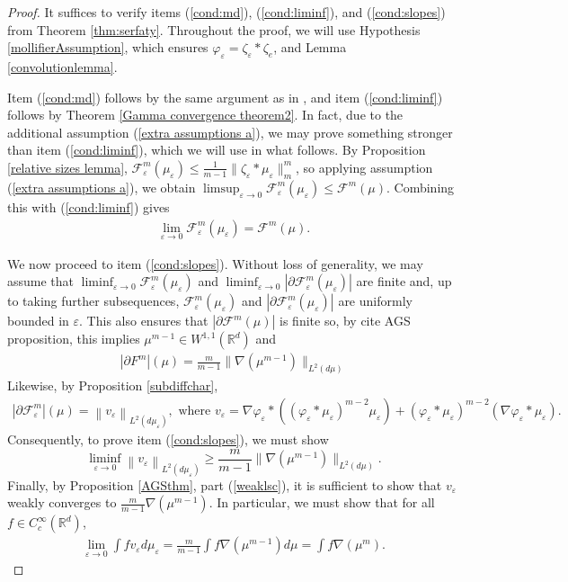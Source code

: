 \documentclass[11pt,leqno]{amsart}
\theoremstyle{definition}
\newcommand{\Rd}{{\mathord{\mathbb R}^d}}
\newcommand{\grad}{\nabla}
\newcommand{\F}{\mathcal{F}}
\def\epsilon{\varepsilon}
\def\e{\varepsilon}
\def\F{\mathcal{F}}
\begin{document}
\begin{proof}
It suffices to verify items (\ref{cond:md}), (\ref{cond:liminf}), and (\ref{cond:slopes}) from Theorem \ref{thm:serfaty}. Throughout the proof, we will use Hypothesis \ref{mollifierAssumption}, which ensures $\varphi_\e = \zeta_\e*\zeta_e$, and Lemma \ref{convolutionlemma}.

Item (\ref{cond:md}) follows by the same argument as in \cite[Theorem 5.6]{CraigTopaloglu}, and item (\ref{cond:liminf}) follows by Theorem \ref{Gamma convergence theorem2}. In fact, due to the additional assumption (\ref{extra assumptions a}), we may prove something stronger than item (\ref{cond:liminf}), which we will use in what follows. By Proposition \ref{relative sizes lemma},
$\F_\e^m(\mu_\e) \leq \frac{1}{m-1} \|\zeta_\e*\mu_\e\|_m^m$, so applying assumption (\ref{extra assumptions a}), we obtain $\limsup_{\e \to 0} \F_\e^m(\mu_\e) \leq \F^m(\mu)$.
Combining this with (\ref{cond:liminf}) gives 
\begin{align} \label{energyconv}
\lim_{\e \to 0} \F^m_\e(\mu_\e) = \F^m(\mu).
\end{align}

We now proceed to item (\ref{cond:slopes}). Without loss of generality, we may assume that $\liminf_{\e \to 0}\F^m_\e(\mu_\e)$ and $\liminf_{\e \to 0} |\partial \F^m_\e(\mu_\e)|$ are finite and, up to taking further subsequences, $\F^m_\e(\mu_\e)$ and $|\partial \F^m_\e(\mu_\e)|$ are uniformly bounded in $\epsilon$. This also ensures that $|\partial \F^m(\mu)|$ is finite so, by {\color{Aquamarine} cite AGS proposition}, this implies $\mu^{m-1} \in W^{1,1}(\Rd)$ and 
\begin{align*}
|\partial F^m|(\mu) = \frac{m}{m-1} \| \grad (\mu^{m-1} ) \|_{L^2(d \mu)}
\end{align*}
Likewise, by Proposition \ref{subdiffchar},
\begin{align} \label{vepsdef}
|\partial \F^m_\e|(\mu) = \left\|v_\e \right\|_{L^2(d \mu_\e)}, \text{ where } v_\e = \grad \varphi_\e* \left((\varphi_\e*\mu_\e)^{m-2} \mu_\e \right) + (\varphi_\e* \mu_\e)^{m-2} (\grad \varphi_\e * \mu_\e).
\end{align}
Consequently, to prove item (\ref{cond:slopes}), we must show
\[ \liminf_{\e \to 0}  \left\| v_\e \right\|_{L^2(d \mu_\e)} \geq \frac{m}{m-1} \| \grad (\mu^{m-1} ) \|_{L^2(d \mu)} . \]
Finally, by Proposition \ref{AGSthm}, part (\ref{weaklsc}), it is sufficient to show that $v_\e$ weakly converges to $\frac{m}{m-1} \grad (\mu^{m-1} )$. In particular, we must show that for all $f \in C^\infty_c(\Rd)$, 
\begin{align} \label{GFgoal1}
\lim_{\e \to 0} \int f v_\e d \mu_\e = \frac{m}{m-1} \int f \grad (\mu^{m-1} ) d \mu = \int f \grad (\mu^m).
\end{align}


\end{proof}
\end{document}
